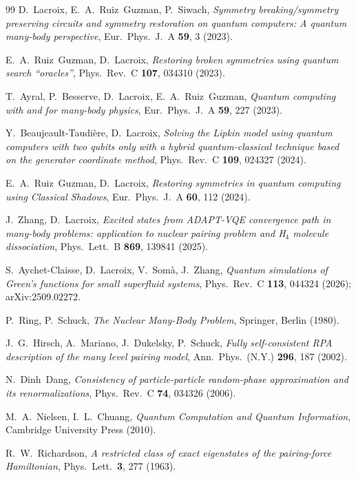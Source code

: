 \documentclass[
  aps,            %
  prc,            %
  reprint,        %
  superscriptaddress,
  floatfix,
  nofootinbib
]{revtex4-2}
\begin{document}
\begin{thebibliography}{99}
D.~Lacroix, E.~A.~Ruiz~Guzman, P.~Siwach,
\textit{Symmetry breaking/symmetry preserving circuits and symmetry restoration on quantum computers: A quantum many-body perspective},
Eur.\ Phys.\ J.\ A \textbf{59}, 3 (2023).

E.~A.~Ruiz~Guzman, D.~Lacroix,
\textit{Restoring broken symmetries using quantum search ``oracles''},
Phys.\ Rev.\ C \textbf{107}, 034310 (2023).

T.~Ayral, P.~Besserve, D.~Lacroix, E.~A.~Ruiz~Guzman,
\textit{Quantum computing with and for many-body physics},
Eur.\ Phys.\ J.\ A \textbf{59}, 227 (2023).

Y.~Beaujeault-Taudi\`ere, D.~Lacroix,
\textit{Solving the Lipkin model using quantum computers with two qubits only with a hybrid quantum-classical technique based on the generator coordinate method},
Phys.\ Rev.\ C \textbf{109}, 024327 (2024).

E.~A.~Ruiz~Guzman, D.~Lacroix,
\textit{Restoring symmetries in quantum computing using Classical Shadows},
Eur.\ Phys.\ J.\ A \textbf{60}, 112 (2024).

J.~Zhang, D.~Lacroix,
\textit{Excited states from ADAPT-VQE convergence path in many-body problems: application to nuclear pairing problem and H$_4$ molecule dissociation},
Phys.\ Lett.\ B \textbf{869}, 139841 (2025).

S.~Aychet-Claisse, D.~Lacroix, V.~Som\`a, J.~Zhang,
\textit{Quantum simulations of Green's functions for small superfluid systems},
Phys.\ Rev.\ C \textbf{113}, 044324 (2026); arXiv:2509.02272.

P.~Ring, P.~Schuck,
\textit{The Nuclear Many-Body Problem},
Springer, Berlin (1980).

J.~G.~Hirsch, A.~Mariano, J.~Dukelsky, P.~Schuck,
\textit{Fully self-consistent RPA description of the many level pairing model},
Ann.\ Phys.\ (N.Y.) \textbf{296}, 187 (2002).

N.~Dinh~Dang,
\textit{Consistency of particle-particle random-phase approximation and its
renormalizations},
Phys.\ Rev.\ C \textbf{74}, 034326 (2006).

M.~A.~Nielsen, I.~L.~Chuang,
\textit{Quantum Computation and Quantum Information},
Cambridge University Press (2010).

R.~W.~Richardson,
\textit{A restricted class of exact eigenstates of the pairing-force Hamiltonian},
Phys.\ Lett.\ \textbf{3}, 277 (1963).


\end{thebibliography}
\end{document}
